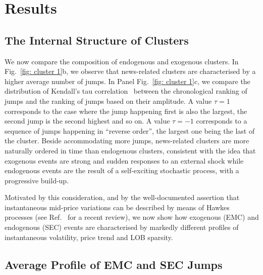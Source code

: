 \documentclass[amsmath,amssymb,aps,pre,floatfix,twocolumn,superscriptaddress]{revtex4}
\begin{document}
\section{Results}

\subsection{The Internal Structure of Clusters}

We now compare the composition of endogenous and exogenous clusters. In Fig.~\ref{fig: cluster 1}b, we observe that news-related clusters are characterised by a higher average number of jumps. In Panel Fig.~\ref{fig: cluster 1}c, we compare the distribution of Kendall's tau correlation~\cite{kendall1938new} between the chronological ranking of jumps and the ranking of jumps based on their amplitude. A value $\tau=1$ corresponds to the case where the jump happening first is also the largest, the second jump is the second highest and so on. A value $\tau=-1$ corresponds to a sequence of jumps happening in ``reverse order'', the largest one being the last of the cluster. 
Beside accommodating more jumps, news-related clusters are more naturally ordered in time than endogenous clusters, consistent with the idea that exogenous events are strong and sudden responses to an external shock while endogenous events are the result of a self-exciting stochastic process, with a progressive build-up. 

Motivated by this consideration, and by the well-documented assertion that instantaneous mid-price variations can be described by means of Hawkes processes (see Ref.~\cite{hawkes_mastromatteo} for a recent review), we now show how exogenous (EMC) and endogenous (SEC) events are characterised by markedly different profiles of instantaneous volatility, price trend and LOB sparsity. 

\subsection{Average Profile of EMC and SEC Jumps}
\end{document}
